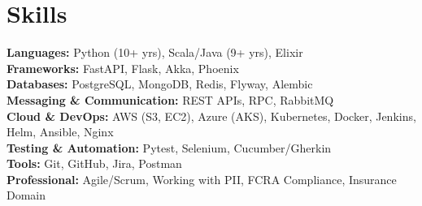 \documentclass[letterpaper,12pt]{article}
\begin{document}
%
\section{Skills}

 \begin{itemize}[leftmargin=0.15in, label={}]
    \small{\item{
     \textbf{Languages:} Python (10+ yrs), Scala/Java (9+ yrs), Elixir \\
     \textbf{Frameworks:} FastAPI, Flask, Akka, Phoenix \\
     \textbf{Databases:} PostgreSQL, MongoDB, Redis, Flyway, Alembic \\
     \textbf{Messaging \& Communication:} REST APIs, RPC, RabbitMQ \\
     \textbf{Cloud \& DevOps:} AWS (S3, EC2), Azure (AKS), Kubernetes, Docker, Jenkins, Helm, Ansible, Nginx \\
     \textbf{Testing \& Automation:} Pytest, Selenium, Cucumber/Gherkin \\
     \textbf{Tools:} Git, GitHub, Jira, Postman \\
      \textbf{Professional:} Agile/Scrum, Working with PII, FCRA Compliance, Insurance Domain \\
    }}
 \end{itemize}


\end{document}
